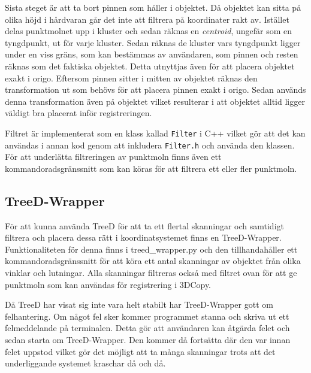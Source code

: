 \documentclass[a4paper,titlepage,12pt]{article}
\begin{document}
		Sista steget är att ta bort pinnen som håller i objektet. Då objektet kan sitta på olika höjd i hårdvaran går det inte att filtrera på koordinater rakt av. Istället delas punktmolnet upp i kluster och sedan räknas en \textit{centroid}, ungefär som en tyngdpunkt, ut för varje kluster. Sedan räknas de kluster vars tyngdpunkt ligger under en viss gräns, som kan bestämmas av användaren, som pinnen och resten räknas som det faktiska objektet. Detta utnyttjas även för att placera objektet exakt i origo. Eftersom pinnen sitter i mitten av objektet räknas den transformation ut som behövs för att placera pinnen exakt i origo. Sedan används denna transformation även på objektet vilket resulterar i att objektet alltid ligger väldigt bra placerat inför registreringen.
		
		Filtret är implementerat som en klass kallad \texttt{Filter} i C++ vilket gör att det kan användas i annan kod genom att inkludera \texttt{Filter.h} och använda den klassen. För att underlätta filtreringen av punktmoln finns även ett kommandoradsgränssnitt som kan köras för att filtrera ett eller fler punktmoln.
		
	\subsection{TreeD-Wrapper}
		För att kunna använda TreeD för att ta ett flertal skanningar och samtidigt filtrera och placera dessa rätt i koordinatsystemet finns en TreeD-Wrapper. Funktionaliteten för denna finns i treed\_wrapper.py och den tillhandahåller ett kommandoradsgränssnitt för att köra ett antal skanningar av objektet från olika vinklar och lutningar. Alla skanningar filtreras också med filtret ovan för att ge punktmoln som kan användas för registrering i 3DCopy.
		
		Då TreeD har visat sig inte vara helt stabilt har TreeD-Wrapper gott om felhantering. Om något fel sker kommer programmet stanna och skriva ut ett felmeddelande på terminalen. Detta gör att användaren kan åtgärda felet och sedan starta om TreeD-Wrapper. Den kommer då fortsätta där den var innan felet uppstod vilket gör det möjligt att ta många skanningar trots att det underliggande systemet kraschar då och då.
		
\newpage
\end{document}
